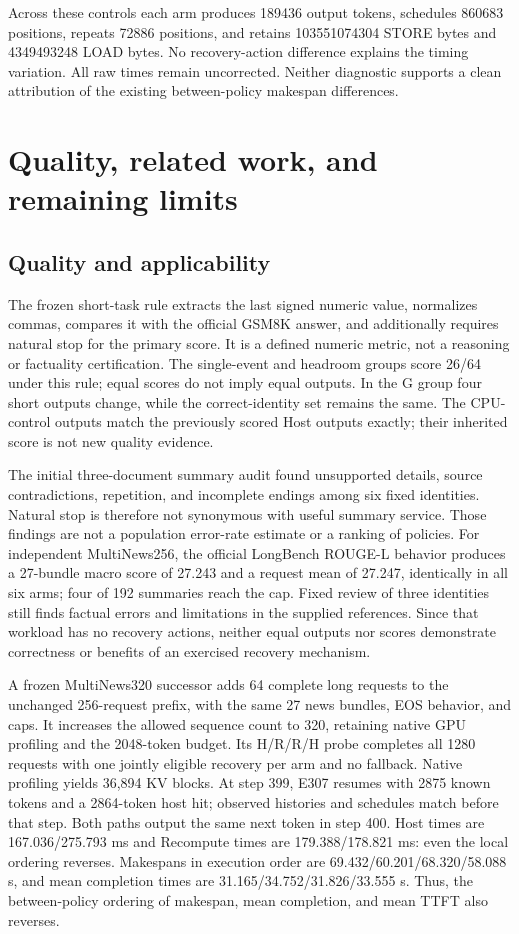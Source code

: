 \documentclass[10pt,a4paper]{article}
\begin{document}
Across these controls each arm produces 189436 output tokens, schedules 860683
positions, repeats 72886 positions, and retains 103551074304 STORE bytes and
4349493248 LOAD bytes. No recovery-action difference explains the timing
variation. All raw times remain uncorrected. Neither diagnostic supports a
clean attribution of the existing between-policy makespan differences.

\section{Quality, related work, and remaining limits}
\subsection{Quality and applicability}
The frozen short-task rule extracts the last signed numeric value, normalizes
commas, compares it with the official GSM8K answer, and additionally requires
natural stop for the primary score. It is a defined numeric metric, not a
reasoning or factuality certification. The single-event and headroom groups
score 26/64 under this rule; equal scores do not imply equal outputs. In the G
group four short outputs change, while the correct-identity set remains the
same. The CPU-control outputs match the previously scored Host outputs exactly;
their inherited score is not new quality evidence.

The initial three-document summary audit found unsupported details, source
contradictions, repetition, and incomplete endings among six fixed identities.
Natural stop is therefore not synonymous with useful summary service. Those
findings are not a population error-rate estimate or a ranking of policies.
For independent MultiNews256, the official LongBench ROUGE-L behavior produces
a 27-bundle macro score of 27.243 and a request mean of 27.247, identically in
all six arms; four of 192 summaries reach the cap. Fixed review of three
identities still finds factual errors and limitations in the supplied references.
Since that workload has no recovery actions, neither equal outputs nor scores
demonstrate correctness or benefits of an exercised recovery mechanism.

A frozen MultiNews320 successor adds 64 complete long requests to the unchanged
256-request prefix, with the same 27 news bundles, EOS behavior, and caps.
It increases the allowed sequence count to 320, retaining native GPU profiling
and the 2048-token budget. Its H/R/R/H probe completes all 1280 requests with one jointly eligible
recovery per arm and no fallback. Native profiling yields 36,894 KV blocks.
At step 399, E307 resumes with 2875 known tokens and a 2864-token host hit;
observed histories and schedules match before that step. Both paths output
the same next token in step 400. Host times are 167.036/275.793 ms and
Recompute times are 179.388/178.821 ms: even the local ordering reverses.
Makespans in execution order are 69.432/60.201/68.320/58.088 s, and mean
completion times are 31.165/34.752/31.826/33.555 s. Thus, the between-policy
ordering of makespan, mean completion, and mean TTFT also reverses.
\end{document}
